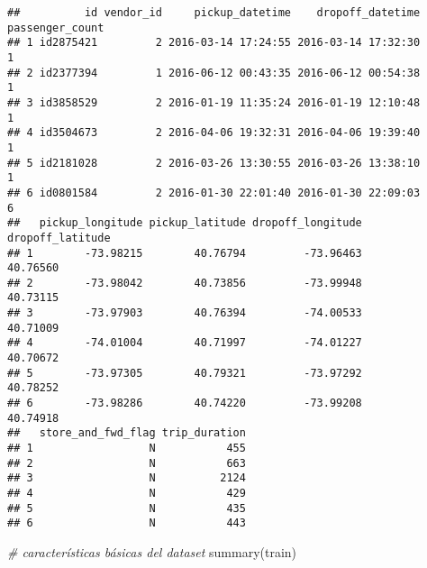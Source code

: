 \documentclass[
]{article}
\newenvironment{Shaded}{\begin{snugshade}}{\end{snugshade}}
\newcommand{\CommentTok}[1]{\textcolor[rgb]{0.56,0.35,0.01}{\textit{#1}}}
\newcommand{\FunctionTok}[1]{\textcolor[rgb]{0.00,0.00,0.00}{#1}}
\newcommand{\NormalTok}[1]{#1}
\begin{document}
\begin{verbatim}
##          id vendor_id     pickup_datetime    dropoff_datetime passenger_count
## 1 id2875421         2 2016-03-14 17:24:55 2016-03-14 17:32:30               1
## 2 id2377394         1 2016-06-12 00:43:35 2016-06-12 00:54:38               1
## 3 id3858529         2 2016-01-19 11:35:24 2016-01-19 12:10:48               1
## 4 id3504673         2 2016-04-06 19:32:31 2016-04-06 19:39:40               1
## 5 id2181028         2 2016-03-26 13:30:55 2016-03-26 13:38:10               1
## 6 id0801584         2 2016-01-30 22:01:40 2016-01-30 22:09:03               6
##   pickup_longitude pickup_latitude dropoff_longitude dropoff_latitude
## 1        -73.98215        40.76794         -73.96463         40.76560
## 2        -73.98042        40.73856         -73.99948         40.73115
## 3        -73.97903        40.76394         -74.00533         40.71009
## 4        -74.01004        40.71997         -74.01227         40.70672
## 5        -73.97305        40.79321         -73.97292         40.78252
## 6        -73.98286        40.74220         -73.99208         40.74918
##   store_and_fwd_flag trip_duration
## 1                  N           455
## 2                  N           663
## 3                  N          2124
## 4                  N           429
## 5                  N           435
## 6                  N           443
\end{verbatim}

\begin{Shaded}
\begin{Highlighting}[]
\CommentTok{\# características básicas del dataset}
\FunctionTok{summary}\NormalTok{(train)}
\end{Highlighting}
\end{Shaded}
\end{document}
